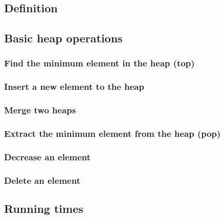 \documentclass{article}
\begin{document}
\subsection{Definition}

\subsection{Basic heap operations}

\subsubsection{Find the minimum element in the heap (top)}

\subsubsection{Insert a new element to the heap}

\subsubsection{Merge two heaps}

\subsubsection{Extract the minimum element from the heap (pop)}

\subsubsection{Decrease an element}

\subsubsection{Delete an element}

\subsection{Running times}


\end{document}
